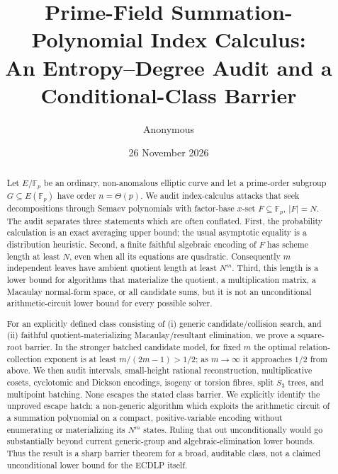 \documentclass[11pt]{article}
\title{Prime-Field Summation-Polynomial Index Calculus:\\
An Entropy--Degree Audit and a Conditional-Class Barrier}
\author{Anonymous}
\date{26 November 2026}
\newcommand{\F}{\mathbb F}
\begin{document}
\maketitle

\begin{center}
\end{center}

\begin{abstract}
Let $E/\F_p$ be an ordinary, non-anomalous elliptic curve and let a prime-order
subgroup $G\subseteq E(\F_p)$ have order $n=\Theta(p)$.  We audit index-calculus
attacks that seek decompositions through Semaev polynomials with factor-base
$x$-set $F\subseteq\F_p$, $|F|=N$.  The audit separates three statements which
are often conflated.  First, the probability calculation is an exact averaging
upper bound; the usual asymptotic equality is a distribution heuristic.
Second, a finite faithful algebraic encoding of $F$ has scheme length at least
$N$, even when all its equations are quadratic.  Consequently $m$ independent
leaves have ambient quotient length at least $N^m$.  Third, this length is a
lower bound for algorithms that materialize the quotient, a multiplication
matrix, a Macaulay normal-form space, or all candidate sums, but it is not an
unconditional arithmetic-circuit lower bound for every possible solver.

For an explicitly defined class consisting of (i) generic candidate/collision
search, and (ii) faithful quotient-materializing Macaulay/resultant elimination,
we prove a square-root barrier.  In the stronger batched candidate model, for %
fixed $m$ the optimal relation-collection exponent is at least
$m/(2m-1)>1/2$; as $m\to\infty$ it approaches $1/2$ from above.  We then audit
intervals, small-height rational reconstruction, multiplicative cosets,
cyclotomic and Dickson encodings, isogeny or torsion fibres, split $S_3$ trees,
and multipoint batching.  None escapes the stated class barrier.  We explicitly
identify the unproved escape hatch: a non-generic algorithm which exploits the
arithmetic circuit of a summation polynomial on a compact, positive-variable
encoding without enumerating or materializing its $N^m$ states.  Ruling that
out unconditionally would go substantially beyond current generic-group and
algebraic-elimination lower bounds.  Thus the result is a sharp barrier theorem
for a broad, auditable class, not a claimed unconditional lower bound for the
ECDLP itself.
\end{abstract}
\end{document}
